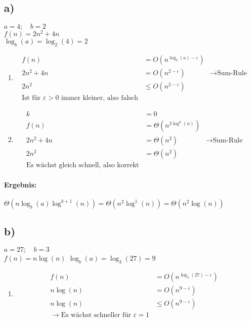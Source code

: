 \documentclass[12pt,letterpaper]{article}
\begin{document}
\subsection*{a)}
$a = 4;\quad b = 2$ \\
$f(n) =  2n^2 + 4n$ \\
$\log_b(a) = \log_2(4) = 2$
\begin{enumerate}
    \item \begin{align*}
              f(n)      & = O(n^{\log_b(a) - \varepsilon})                               \\
              2n^2 + 4n & = O(n^{2 - \varepsilon})         & \rightarrow \text{Sum-Rule} \\
              2n^2      & \leq O(n^{2 - \varepsilon})                                    \\
              \text{Ist für } \varepsilon > 0 \text{ immer kleiner, also falsch}
          \end{align*}
    \item \begin{align*}
              k         & = 0                                                    \\
              f(n)      & = \Theta(n^{2\log^k(n)})                               \\
              2n^2 + 4n & = \Theta(n^2)            & \rightarrow \text{Sum-Rule} \\
              2n^2      & = \Theta(n^2)                                          \\
              \text{Es wächst gleich schnell, also korrekt}
          \end{align*}
\end{enumerate}
\paragraph{Ergebnis:}
$ \Theta(n \log_b(a)\log^{k+1}(n)) = \Theta(n^2 \log^1(n)) = \Theta(n^2 \log(n))$


\subsection*{b)}
$a = 27;\quad b = 3$ \\
$f(n) =  n \log(n)$
$\log_b(a) = \log_3(27) = 9$
\begin{enumerate}
    \item \begin{align*}
              f(n)      & = O(n^{\log_3(27) - \varepsilon}) \\
              n \log(n) & = O(n^{9 - \varepsilon})          \\
              n \log(n) & \leq O(n^{9 - \varepsilon})       \\
              \rightarrow \text{Es wächst schneller für } \varepsilon = 1
          \end{align*}
\end{enumerate}
\end{document}
